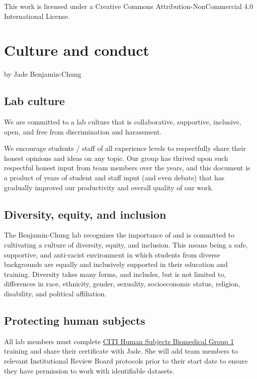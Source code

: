 \documentclass[
]{book}
\begin{document}
This work is licensed under a Creative Commons Attribution-NonCommercial 4.0 International License.

\hypertarget{culture-and-conduct}{%
\chapter{Culture and conduct}\label{culture-and-conduct}}

by Jade Benjamin-Chung

\hypertarget{lab-culture}{%
\section{Lab culture}\label{lab-culture}}

We are committed to a lab culture that is collaborative, supportive, inclusive, open, and free from discrimination and harassment.

We encourage students / staff of all experience levels to respectfully share their honest opinions and ideas on any topic. Our group has thrived upon such respectful honest input from team members over the years, and this document is a product of years of student and staff input (and even debate) that has gradually improved our productivity and overall quality of our work.

\hypertarget{diversity-equity-and-inclusion}{%
\section{Diversity, equity, and inclusion}\label{diversity-equity-and-inclusion}}

The Benjamin-Chung lab recognizes the importance of and is committed to cultivating a culture of diversity, equity, and inclusion. This means being a safe, supportive, and anti-racist environment in which students from diverse backgrounds are equally and inclusively supported in their education and training. Diversity takes many forms, and includes, but is not limited to, differences in race, ethnicity, gender, sexuality, socioeconomic status, religion, disability, and political affiliation.

\hypertarget{protecting-human-subjects}{%
\section{Protecting human subjects}\label{protecting-human-subjects}}

All lab members must complete \href{https://researchcompliance.stanford.edu/panels/hs/forms/training/citi}{CITI Human Subjects Biomedical Group 1} training and share their certificate with Jade. She will add team members to relevant Institutional Review Board protocols prior to their start date to ensure they have permission to work with identifiable datasets.
\end{document}
